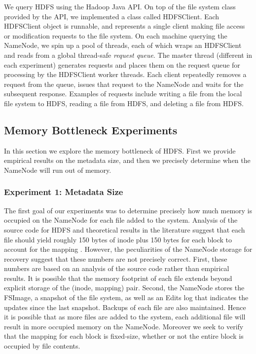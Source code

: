 \documentclass[11pt, a4paper]{article}
\begin{document}
\begin{multicols*}{2}
We query HDFS using the Hadoop Java API. On top of the file system class provided by the API, we implemented a class called HDFSClient. Each HDFSClient object is runnable, and represents a single client making file access or modification requests to the file system. On each machine querying the NameNode, we spin up a pool of threads, each of which wraps an HDFSClient and reads from a global thread-safe \textit{request queue}. The master thread (different in each experiment) generates requests and places them on the request queue for processing by the HDFSClient worker threads. Each client repeatedly removes a request from the queue, issues that request to the NameNode and waits for the subsequent response. Examples of requests include writing a file from the local file system to HDFS, reading a file from HDFS, and deleting a file from HDFS.

\subsection{Memory Bottleneck Experiments}
In this section we explore the memory bottleneck of HDFS. First we provide empirical results on the metadata size, and then we precisely determine when the NameNode will run out of memory.
\subsubsection{Experiment 1: Metadata Size}\label{MetadataSize}
The first goal of our experiments was to determine precisely how much memory is occupied on the NameNode for each file added to the system. Analysis of the source code for HDFS and theoretical results in the literature suggest that each file should yield roughly 150 bytes of inode plus 150 bytes for each block to account for the mapping \cite{HdfsArch, HdfsScale}. However, the peculiarities of the NameNode storage for recovery suggest that these numbers are not precisely correct. First, these numbers are based on an analysis of the source code rather than empirical results. It is possible that the memory footprint of each file extends beyond explicit storage of the (inode, mapping) pair. Second, the NameNode stores the FSImage, a snapshot of the file system, as well as an Edits log that indicates the updates since the last snapshot. Backups of each file are also maintained. Hence it is possible that as more files are added to the system, each additional file will result in more occupied memory on the NameNode. Moreover we seek to verify that the mapping for each block is fixed-size, whether or not the entire block is occupied by file contents.


\end{multicols*}
\end{document}
